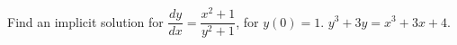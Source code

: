 {Find an implicit solution for
$\dfrac{dy}{dx} = \dfrac{x^2+1}{y^2+1}$, for $y(0) = 1$.}
{$y^3+3y = x^3+3x+4$.}